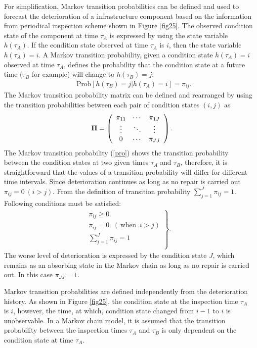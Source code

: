 For simplification, Markov transition probabilities can be defined and used to forecast the deterioration of a infrastructure component based on the information from periodical inspection scheme shown in Figure \ref{fig25}. The observed condition state of the component at time $\tau_A$ is expressed by using the state variable $h(\tau_A) $. If the condition state observed at time $\tau_A$ is $i$, then the state variable $h(\tau_A)=i$. A Markov transition probability, given a condition state $h(\tau_A) =i$ observed at time $\tau_A$, defines the probability that the condition state at a future time ($\tau_B$ for example) will change to $h(\tau_B) =j$:
\begin{eqnarray}
&& \mbox{Prob}[h(\tau_B)=j|h(\tau_A)=i]=\pi_{ij}.\label{pro}
\end{eqnarray}
The Markov transition probability matrix can be defined and rearranged by using the transition probabilities between each pair of condition states $(i,j)$ as
\begin{eqnarray}
&& {\bf \Pi}=\left(
\begin{array}{ccc}
\pi_{11} & \cdots & \pi_{1J} \\
\vdots & \ddots & \vdots \\
0 & \cdots & \pi_{JJ}
\end{array}
\right). 
\end{eqnarray}
The Markov transition probability (\ref{pro}) shows the transition probability between the condition states at two given times $\tau_A$ and $\tau_B$, therefore, it is straightforward that the values of a transition probability will differ for different time intervals. Since deterioration continues as long as no repair is carried out $\pi_{ij}=0~(i>j)$. From the definition of transition probability $\sum^{J}_{j=1}\pi_{ij}=1$. Following conditions must be satisfied:
\begin{eqnarray}
\left.
\begin{array}{l}
\pi_{ij}\geq 0 \\
\pi_{ij}=0 \,\,~(\,\mbox{when} \,\,\, i>j) \\
\sum_{j=1}^J \pi_{ij}=1 \\
\end{array}
\right\}.\label{suii}
\end{eqnarray}
The worse level of deterioration is expressed by the condition state $J$, which remains as an absorbing state in the Markov chain as long as no repair is carried out. In this case $\pi_{JJ}=1$.

Markov transition probabilities are defined independently from the deterioration history. As shown in Figure \ref{fig25}, the condition state at the inspection time $\tau_A$ is $i$, however, the time, at which, condition state changed from $i-1$ to $i$ is unobservable. In a Markov chain model, it is assumed that the transition probability between the inspection times $\tau_A$ and $\tau_B$ is only dependent on the condition state at time $\tau_A$. 

